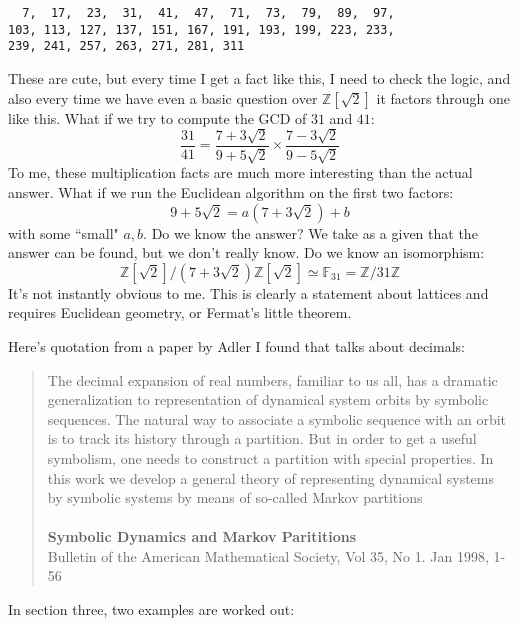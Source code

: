 \documentclass[12pt]{article}
\begin{document}
\begin{verbatim}
  7,  17,  23,  31,  41,  47,  71,  73,  79,  89,  97, 
103, 113, 127, 137, 151, 167, 191, 193, 199, 223, 233, 
239, 241, 257, 263, 271, 281, 311
\end{verbatim}
These are cute, but every time I get a fact like this, I need to check the logic, and also every time we have even a basic question over $\mathbb{Z}[\sqrt{2}]$ it factors through one like this.  What if we try to compute the GCD of $31$ and $41$:
$$ \frac{31}{41} = \frac{7 + 3 \sqrt{2}}{9 + 5 \sqrt{2}}\times
\frac{7 - 3 \sqrt{2}}{9 - 5 \sqrt{2}}$$
To me, these multiplication facts are much more interesting than the actual answer. What if we run the Euclidean algorithm on the first two factors:
$$ 9 + 5 \sqrt{2} 
 = a(7 + 3 \sqrt{2}) + b $$
 with some ``small" $a,b$.  Do we know the answer?  We take as a given that the answer can be found, but we don't really know.  Do we know an isomorphism:
 $$ \mathbb{Z}[\sqrt{2}]/(7 + 3 \sqrt{2})\mathbb{Z}[\sqrt{2}] \simeq \mathbb{F}_{31} = \mathbb{Z}/31 \mathbb{Z} $$
 It's not instantly obvious to me.  This is clearly a statement about lattices and requires Euclidean geometry, or Fermat's little theorem.
 
\newpage
 
\noindent Here's quotation from a paper by Adler I found that talks about decimals:

\begin{quotation} {\color{black!50!blue} The decimal expansion of real numbers, familiar to us all, has a
dramatic generalization to representation of dynamical system orbits by symbolic
sequences. The natural way to associate a symbolic sequence with an
orbit is to track its history through a partition. But in order to get a useful
symbolism, one needs to construct a partition with special properties. In this
work we develop a general theory of representing dynamical systems by symbolic
systems by means of so-called Markov partitions }\\ \\
\textbf{Symbolic Dynamics and Markov Parititions} \\
Bulletin of the American Mathematical Society, Vol 35, No 1. Jan 1998, 1-56 \end{quotation}
In section three, two examples are worked out:
\end{document}
